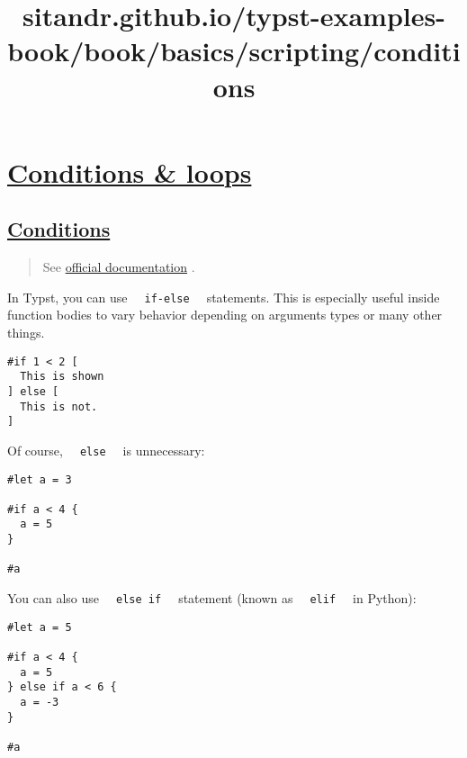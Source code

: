 \title{sitandr.github.io/typst-examples-book/book/basics/scripting/conditions}

\section{\texorpdfstring{\hyperref[conditions--loops]{Conditions \&
loops}}{Conditions \& loops}}\label{conditions--loops}

\subsection{\texorpdfstring{\hyperref[conditions]{Conditions}}{Conditions}}\label{conditions}

\begin{quote}
See
\href{https://typst.app/docs/reference/scripting/\#conditionals}{official
documentation} .
\end{quote}

In Typst, you can use \texttt{\ }{\texttt{\ if-else\ }}\texttt{\ }
statements. This is especially useful inside function bodies to vary
behavior depending on arguments types or many other things.

\begin{verbatim}
#if 1 < 2 [
  This is shown
] else [
  This is not.
]
\end{verbatim}

\pandocbounded{}

Of course, \texttt{\ }{\texttt{\ else\ }}\texttt{\ } is unnecessary:

\begin{verbatim}
#let a = 3

#if a < 4 {
  a = 5
}

#a
\end{verbatim}

\pandocbounded{}

You can also use \texttt{\ }{\texttt{\ else\ if\ }}\texttt{\ } statement
(known as \texttt{\ }{\texttt{\ elif\ }}\texttt{\ } in Python):

\begin{verbatim}
#let a = 5

#if a < 4 {
  a = 5
} else if a < 6 {
  a = -3
}

#a
\end{verbatim}

